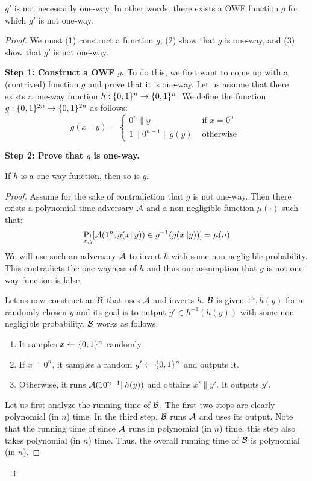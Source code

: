 \begin{claim}
$g'$ is not necessarily one-way. In other words, there exists a OWF function $g$ for which $g'$ is not one-way.
\end{claim}
\begin{proof}
We must (1) construct a function $g$, (2) show that $g$ is one-way, and (3) show that $g'$ is not one-way.


\noindent\textbf{Step 1: Construct a OWF $g$.} 
To do this, we first want to come up with a (contrived) function $g$ and prove that it is one-way.
Let us assume that there exists a one-way function $h : \{0,1\}^n \rightarrow \{0,1\}^n$. We define the function $g : \{0,1\}^{2n} \rightarrow \{0,1\}^{2n}$ as follows:
$$
g(x\|y) = \begin{cases}
 0^{n}\|y &\text{    if } x = 0^n\\
1\|0^{n-1}\|g(y) &\text{    otherwise }
\end{cases}
$$

\noindent\textbf{Step 2: Prove that $g$ is one-way.}

\begin{claim}
If $h$ is a one-way function, then so is $g$.
\end{claim}
\begin{proof}
Assume for the sake of contradiction that $g$ is not one-way. Then there exists a polynomial time adversary $\mathcal{A}$ and a non-negligible function $\mu(\cdot)$ such that:
$$
\Pr_{x,y}[\mathcal{A}(1^n,g(x\|y)) \in g^{-1}(g(x\|y))] = \mu(n)
$$
We will use such an adversary $\mathcal{A}$ to invert $h$ with some non-negligible probability. This contradicts the one-wayness of $h$ and thus our assumption that $g$ is not one-way function is false.

Let us now construct an $\mathcal{B}$ that uses $\mathcal{A}$ and inverts $h$. $\mathcal{B}$ is given $1^n,h(y)$ for a randomly chosen $y$ and its goal is to output $y' \in h^{-1}(h(y))$ with some non-negligible probability. $\mathcal{B}$ works as follows:
\begin{enumerate}
\item It samples $x \gets \{0,1\}^n$ randomly.
\item If $x = 0^n$, it samples a random $y' \gets \{0,1\}^n$ and outputs it.
\item Otherwise, it runs $\mathcal{A}(10^{n-1}\|h(y))$ and obtains $x' \| y'$. It outputs $y'$.
\end{enumerate}

Let us first analyze the running time of $\mathcal{B}$. The first two steps are clearly polynomial (in $n$) time. In the third step, $\mathcal{B}$ runs $\mathcal{A}$ and uses its output. Note that the running time of since $\mathcal{A}$ runs in polynomial (in $n$) time, this step also takes polynomial (in $n$) time. Thus, the overall running time of $\mathcal{B}$ is polynomial (in $n$).


\end{proof}
\end{proof}
